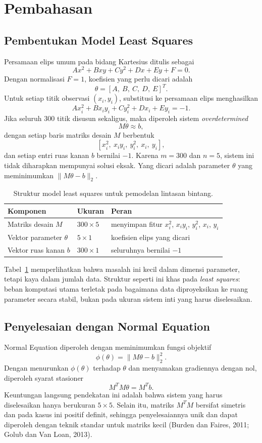 \documentclass[12pt,a4paper]{article}
\begin{document}
\section{Pembahasan}
\subsection{Pembentukan Model Least Squares}
Persamaan elips umum pada bidang Kartesius ditulis sebagai
\[
Ax^2 + Bxy + Cy^2 + Dx + Ey + F = 0.
\]
Dengan normalisasi \(F=1\), koefisien yang perlu dicari adalah
\[
\theta = [A,\ B,\ C,\ D,\ E]^T.
\]
Untuk setiap titik observasi \((x_i,y_i)\), substitusi ke persamaan elips menghasilkan
\[
A x_i^2 + B x_i y_i + C y_i^2 + D x_i + E y_i = -1.
\]
Jika seluruh 300 titik disusun sekaligus, maka diperoleh sistem \emph{overdetermined}
\[
M\theta \approx b,
\]
dengan setiap baris matriks desain \(M\) berbentuk
\[
[x_i^2,\ x_i y_i,\ y_i^2,\ x_i,\ y_i],
\]
dan setiap entri ruas kanan \(b\) bernilai \(-1\). Karena \(m=300\) dan \(n=5\), sistem ini tidak diharapkan mempunyai solusi eksak. Yang dicari adalah parameter \(\theta\) yang meminimumkan \(\|M\theta-b\|_2\).

\begin{table}[h]
\centering
\caption{Struktur model least squares untuk pemodelan lintasan bintang.}
\label{tab:star-model}
\begin{tabular}{lll}
\toprule
Komponen & Ukuran & Peran \\
\midrule
Matriks desain $M$ & $300 \times 5$ & menyimpan fitur $x_i^2$, $x_i y_i$, $y_i^2$, $x_i$, $y_i$ \\
Vektor parameter $\theta$ & $5 \times 1$ & koefisien elips yang dicari \\
Vektor ruas kanan $b$ & $300 \times 1$ & seluruhnya bernilai $-1$ \\
\bottomrule
\end{tabular}
\end{table}

Tabel~\ref{tab:star-model} memperlihatkan bahwa masalah ini kecil dalam dimensi parameter, tetapi kaya dalam jumlah data. Struktur seperti ini khas pada \emph{least squares}: beban komputasi utama terletak pada bagaimana data diproyeksikan ke ruang parameter secara stabil, bukan pada ukuran sistem inti yang harus diselesaikan.

\subsection{Penyelesaian dengan Normal Equation}
Normal Equation diperoleh dengan meminimumkan fungsi objektif
\[
\phi(\theta)=\|M\theta-b\|_2^2.
\]
Dengan menurunkan \(\phi(\theta)\) terhadap \(\theta\) dan menyamakan gradiennya dengan nol, diperoleh syarat stasioner
\[
M^TM\theta = M^Tb.
\]
Keuntungan langsung pendekatan ini adalah bahwa sistem yang harus diselesaikan hanya berukuran \(5\times 5\). Selain itu, matriks \(M^TM\) bersifat simetris dan pada kasus ini positif definit, sehingga penyelesaiannya unik dan dapat diperoleh dengan teknik standar untuk matriks kecil (Burden dan Faires, 2011; Golub dan Van Loan, 2013).
\end{document}
